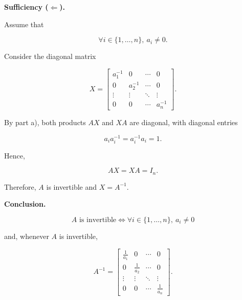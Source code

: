 \begin{enumerate}[label=\alph*)]
\begin{answer}
        \medskip
        \noindent\textbf{Sufficiency ($\Leftarrow$).}

        Assume that

        $$
        \forall i\in\{1,\ldots,n\},\ a_i\neq0.
        $$

        Consider the diagonal matrix

        $$
        X=
        \begin{bmatrix}
            a_1^{-1} & 0 & \cdots & 0 \\
            0 & a_2^{-1} & \cdots & 0 \\
            \vdots & \vdots & \ddots & \vdots \\
            0 & 0 & \cdots & a_n^{-1}
        \end{bmatrix}.
        $$

        By part a), both products $AX$ and
        $XA$ are diagonal, with diagonal
        entries

        $$
        a_i a_i^{-1}=a_i^{-1}a_i=1.
        $$

        Hence,

        $$
        AX=XA=I_n.
        $$

        Therefore, $A$ is invertible
        and $X=A^{-1}$.

        \medskip
        \noindent\textbf{Conclusion.}

        $$
        \boxed{
        A\text{ is invertible}
        \iff
        \forall i\in\{1,\ldots,n\},\ a_i\neq0
        }
        $$

        and, whenever $A$ is invertible,

        $$
        \boxed{
        A^{-1}=
        \begin{bmatrix}
            \frac{1}{a_1} & 0 & \cdots & 0 \\
            0 & \frac{1}{a_2} & \cdots & 0 \\
            \vdots & \vdots & \ddots & \vdots \\
            0 & 0 & \cdots & \frac{1}{a_n}
        \end{bmatrix}
        }.
        $$
    \end{answer}

\end{enumerate}

